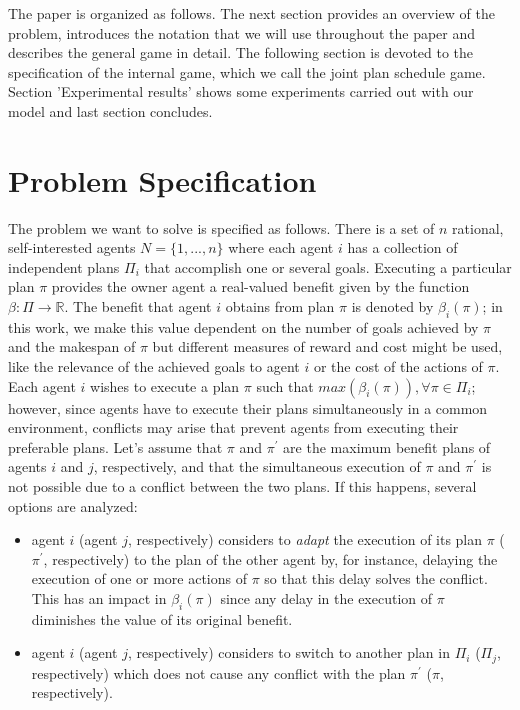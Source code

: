 \documentclass[letterpaper]{article}
\begin{document}
The paper is organized as follows. The next section provides an overview of the problem, introduces the notation that we will use throughout the paper and describes the general game in detail. The following section is devoted to the specification of the internal game, which we call the joint plan schedule game. Section 'Experimental results' shows some experiments carried out with our model and last section concludes.


\section{Problem Specification}


The problem we want to solve is specified as follows. There is a set of $n$ rational, self-interested agents $N=\{1,..., n\}$ where each agent $i$ has a collection of independent plans $\Pi_i$ that accomplish one or several goals. Executing a particular plan $\pi$ provides the owner agent a real-valued benefit given by the function $\beta: \Pi \rightarrow \mathbb{R}$. The benefit that agent $i$ obtains from plan $\pi$ is denoted by $\beta_i(\pi)$; in this work, we make this value dependent on the number of goals achieved by $\pi$ and the makespan of $\pi$ but different measures of reward and cost might be used, like the relevance of the achieved goals to agent $i$ or the cost of the actions of $\pi$. Each agent $i$ wishes to execute a plan $\pi$ such that $max(\beta_i(\pi)), \forall \pi \in \Pi_i$; however, since agents have to execute their plans simultaneously in a common environment, conflicts may arise that prevent agents from executing their preferable plans. Let's assume that $\pi$ and $\pi^\prime$ are the maximum benefit plans of agents $i$ and $j$, respectively, and that the simultaneous execution of $\pi$ and $\pi^\prime$ is not possible due to a conflict between the two plans. If this happens, several options are analyzed:

\begin{itemize}
\item agent $i$ (agent $j$, respectively) considers to \emph{adapt} the execution of its plan $\pi$ ($\pi^\prime$, respectively) to the plan of the other agent by, for instance, delaying the execution of one or more actions of $\pi$ so that this delay solves the conflict. This has an impact in $\beta_i(\pi)$ since any delay in the execution of $\pi$ diminishes the value of its original benefit.
\item agent $i$ (agent $j$, respectively) considers to switch to another plan in $\Pi_i$ ($\Pi_j$, respectively) which does not cause any conflict with the plan $\pi^\prime$ ($\pi$, respectively).
\end{itemize}
\end{document}
